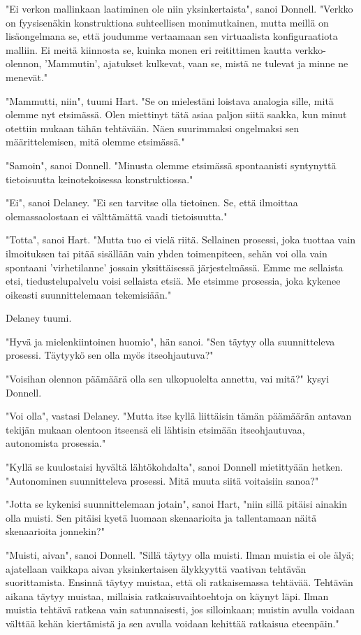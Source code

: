 "Ei verkon mallinkaan laatiminen ole niin yksinkertaista", sanoi Donnell. "Verkko on fyysisenäkin konstruktiona suhteellisen monimutkainen, mutta meillä on lisäongelmana se, että joudumme vertaamaan sen virtuaalista konfiguraatiota malliin. Ei meitä kiinnosta se, kuinka monen eri reitittimen kautta verkko-olennon, 'Mammutin', ajatukset kulkevat, vaan se, mistä ne tulevat ja minne ne menevät."


"Mammutti, niin", tuumi Hart. "Se on mielestäni loistava analogia sille, mitä olemme nyt etsimässä. Olen miettinyt tätä asiaa paljon siitä saakka, kun minut otettiin mukaan tähän tehtävään. Näen suurimmaksi ongelmaksi sen määrittelemisen, mitä olemme etsimässä."


"Samoin", sanoi Donnell. "Minusta olemme etsimässä spontaanisti syntynyttä tietoisuutta keinotekoisessa konstruktiossa."


"Ei", sanoi Delaney. "Ei sen tarvitse olla tietoinen. Se, että ilmoittaa olemassaolostaan ei välttämättä vaadi tietoisuutta."


"Totta", sanoi Hart. "Mutta tuo ei vielä riitä. Sellainen prosessi, joka tuottaa vain ilmoituksen tai pitää sisällään vain yhden toimenpiteen, sehän voi olla vain spontaani 'virhetilanne' jossain yksittäisessä järjestelmässä. Emme me sellaista etsi, tiedustelupalvelu voisi sellaista etsiä. Me etsimme prosessia, joka kykenee oikeasti suunnittelemaan tekemisiään."


Delaney tuumi.


"Hyvä ja mielenkiintoinen huomio", hän sanoi. "Sen täytyy olla suunnitteleva prosessi. Täytyykö sen olla myös itseohjautuva?"


"Voisihan olennon päämäärä olla sen ulkopuolelta annettu, vai mitä?" kysyi Donnell.


"Voi olla", vastasi Delaney. "Mutta itse kyllä liittäisin tämän päämäärän antavan tekijän mukaan olentoon itseensä eli lähtisin etsimään itseohjautuvaa, autonomista prosessia."


"Kyllä se kuulostaisi hyvältä lähtökohdalta", sanoi Donnell mietittyään hetken. "Autonominen suunnitteleva prosessi. Mitä muuta siitä voitaisiin sanoa?"


"Jotta se kykenisi suunnittelemaan jotain", sanoi Hart, "niin sillä pitäisi ainakin olla muisti. Sen pitäisi kyetä luomaan skenaarioita ja tallentamaan näitä skenaarioita jonnekin?"


"Muisti, aivan", sanoi Donnell. "Sillä täytyy olla muisti. Ilman muistia ei ole älyä; ajatellaan vaikkapa aivan yksinkertaisen älykkyyttä vaativan tehtävän suorittamista. Ensinnä täytyy muistaa, että oli ratkaisemassa tehtävää. Tehtävän aikana täytyy muistaa, millaisia ratkaisuvaihtoehtoja on käynyt läpi. Ilman muistia tehtävä ratkeaa vain satunnaisesti, jos silloinkaan; muistin avulla voidaan välttää kehän kiertämistä ja sen avulla voidaan kehittää ratkaisua eteenpäin."


